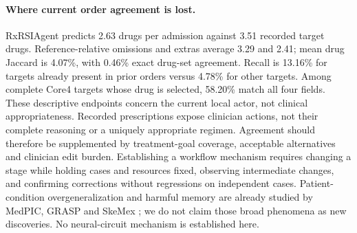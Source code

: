 \paragraph{Where current order agreement is lost.} RxRSIAgent predicts 2.63 drugs per admission against 3.51 recorded target drugs. Reference-relative omissions and extras average 3.29 and 2.41; mean drug Jaccard is 4.07\%, with 0.46\% exact drug-set agreement. Recall is 13.16\% for targets already present in prior orders versus 4.78\% for other targets. Among complete Core4 targets whose drug is selected, 58.20\% match all four fields.
These descriptive endpoints concern the current local actor, not clinical appropriateness. Recorded prescriptions expose clinician actions, not their complete reasoning or a uniquely appropriate regimen. Agreement should therefore be supplemented by treatment-goal coverage, acceptable alternatives and clinician edit burden. Establishing a workflow mechanism requires changing a stage while holding cases and resources fixed, observing intermediate changes, and confirming corrections without regressions on independent cases. Patient-condition overgeneralization and harmful memory are already studied by MedPIC, GRASP and SkeMex \citep{medpic,grasp,skemex}; we do not claim those broad phenomena as new discoveries. No neural-circuit mechanism is established here.


